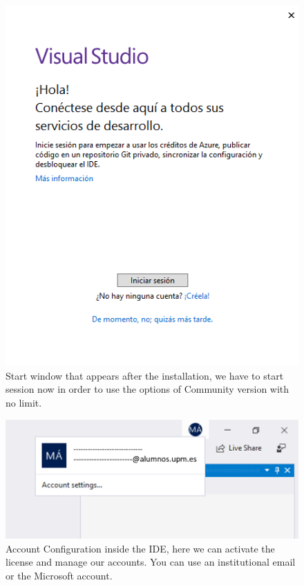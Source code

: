 \begin{figure}
    \centering
    \includegraphics[width=0.7 \textwidth]{Figures/Instalacion2}
    \caption{Start window that appears after the installation, we have to start session now in order to use the options of Community version with no limit.}
    \label{fig:Instalacion2}
\end{figure}

\begin{figure}
    \centering
    \includegraphics[width= \textwidth]{Figures/Instalacion3}
    \caption{Account Configuration inside the IDE, here we can activate the license and manage our accounts. You can use an institutional email or the Microsoft account.}
    \label{fig:Instalacion3}
\end{figure}


